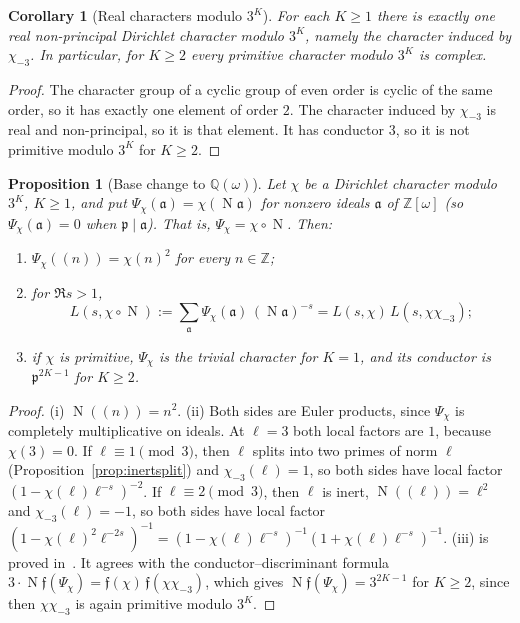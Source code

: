 \documentclass[12pt]{amsart}
\theoremstyle{plain}
\newtheorem{proposition}[theorem]{Proposition}
\newtheorem{corollary}[theorem]{Corollary}
\theoremstyle{definition}
\newcommand{\Z}{\mathbb{Z}}
\newcommand{\Q}{\mathbb{Q}}
\newcommand{\Zomega}{\Z[\omega]}
\newcommand{\Qomega}{\Q(\omega)}
\newcommand{\pp}{\mathfrak{p}}
\DeclareMathOperator{\N}{N}
\begin{document}
\begin{corollary}[Real characters modulo $3^K$]
\label{cor:real}
For each $K \geq 1$ there is exactly one real non-principal Dirichlet
character modulo $3^K$, namely the character induced by $\chi_{-3}$. In
particular, for $K \geq 2$ every primitive character modulo $3^K$ is complex.
\end{corollary}

\begin{proof}
The character group of a cyclic group of even order is cyclic of the same
order, so it has exactly one element of order $2$. The character induced by
$\chi_{-3}$ is real and non-principal, so it is that element. It has
conductor $3$, so it is not primitive modulo $3^K$ for $K \geq 2$.
\end{proof}

\begin{proposition}[Base change to $\Qomega$]
\label{prop:basechange}
Let $\chi$ be a Dirichlet character modulo $3^K$, $K \geq 1$, and put
$\Psi_\chi(\mathfrak a) = \chi(\N\mathfrak a)$ for nonzero ideals
$\mathfrak a$ of $\Zomega$ (so $\Psi_\chi(\mathfrak a) = 0$ when
$\pp \mid \mathfrak a$). That is, $\Psi_\chi = \chi\circ\N$. Then:
\begin{enumerate}[label=(\roman*)]
  \item $\Psi_\chi((n)) = \chi(n)^2$ for every $n \in \Z$;
  \item for $\Re s > 1$,
    \[
      L(s,\chi\circ\N) := \sum_{\mathfrak a} \Psi_\chi(\mathfrak a)\,
      (\N\mathfrak a)^{-s} = L(s,\chi)\,L(s,\chi\chi_{-3});
    \]
  \item if $\chi$ is primitive, $\Psi_\chi$ is the trivial character for
    $K = 1$, and its conductor is $\pp^{2K-1}$ for $K \geq 2$.
\end{enumerate}
\end{proposition}

\begin{proof}
(i) $\N((n)) = n^2$. (ii) Both sides are Euler products, since $\Psi_\chi$
is completely multiplicative on ideals. At $\ell = 3$ both local factors are
$1$, because $\chi(3) = 0$. If $\ell \equiv 1 \pmod 3$, then $\ell$ splits
into two primes of norm $\ell$ (Proposition~\ref{prop:inertsplit}) and
$\chi_{-3}(\ell) = 1$, so both sides have local factor
$(1 - \chi(\ell)\ell^{-s})^{-2}$. If $\ell \equiv 2 \pmod 3$, then $\ell$ is
inert, $\N((\ell)) = \ell^2$ and $\chi_{-3}(\ell) = -1$, so both sides have
local factor
$(1 - \chi(\ell)^2\ell^{-2s})^{-1} = (1-\chi(\ell)\ell^{-s})^{-1}(1+\chi(\ell)\ell^{-s})^{-1}$.
(iii) is proved in~\cite{WakilW3}. It agrees with the conductor--discriminant
formula $3\cdot\N\mathfrak f(\Psi_\chi) = \mathfrak f(\chi)\,\mathfrak f(\chi\chi_{-3})$,
which gives $\N\mathfrak f(\Psi_\chi) = 3^{2K-1}$ for $K \geq 2$, since then
$\chi\chi_{-3}$ is again primitive modulo $3^K$.
\end{proof}
\end{document}
